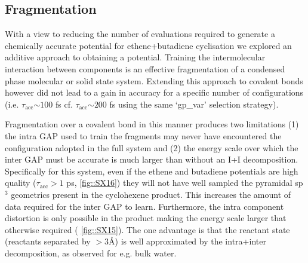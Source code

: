\documentclass[11pt]{article}
\numberwithin{equation}{subsection}
\newcommand{\tacc}{$\tau_\text{acc}$}
\newcommand{\comment}[1]{}
\begin{document}
\clearpage
\subsection{Fragmentation}

\comment{
	TJW: The graph goes to 100, but you stop at 60. Are you going to add more t_acc for n_eval > 60?
	TY: Nope
	
	TJW: Is it worth having a graphical comparison between the t_accs for doing the I+I decomposition vs not doing it?
	TY: I hate bar charts, what do other people think?
}

With a view to reducing the number of evaluations required to generate a chemically accurate potential for ethene+butadiene cyclisation we explored an additive approach to obtaining a potential. Training the intermolecular interaction between components is an effective fragmentation of a condensed phase molecular\cite{gaptrain2021} or solid state system.\cite{Wengert2021} Extending this approach to covalent bonds however did not lead to a  gain in accuracy for a specific number of configurations (i.e. \tacc $\sim 100$ fs cf. \tacc $\sim 200$ fs using the same `gp\_var' selection strategy).

Fragmentation over a covalent bond in this manner produces two limitations (1) the intra GAP used to train the fragments may never have encountered the configuration adopted in the full system and (2) the energy scale over which the inter GAP must be accurate is much larger than without an I+I decomposition. Specifically for this system, even if the ethene and butadiene potentials are high quality ($\tau_\text{acc} > 1$ ps, \figurename{ \ref{fig::SX16}}) they will not have well sampled the pyramidal sp${}^3$ geometrics present in the  cyclohexene product. This increases the amount of data required for the inter GAP to learn. Furthermore, the intra component distortion is only possible in the product making the energy scale larger that otherwise required (\figurename{ \ref{fig::SX15}}). The one advantage is that the reactant state (reactants separated by $> 3$\AA) is well approximated by the intra+inter decomposition, as observed for e.g. bulk water.
\end{document}
